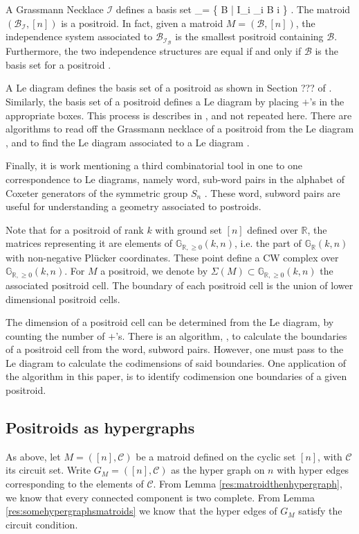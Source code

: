 \documentclass[11pt]{article}
\newcommand{\R}{\mathbb{R}}
\newcommand{\Gr}{\mathbb{G}_{\R, \geq 0}}
\newcommand{\Grall}{\mathbb{G}_{\R}}
\def\ba #1\ea{\begin{align} #1 \end{align}}
\newcommand{\cI}{\mathcal{I}}
\newcommand{\sC}{\mathscr{C}}
\newcommand{\cC}{\mathcal{C}}
\newcommand{\sB}{\mathscr{B}}
\theoremstyle{remark}
\theoremstyle{definition}
\begin{document}
A Grassmann Necklace $\cI$ defines a basis set \ba \sB_\cI = \{ B | I_i \preceq_i B \; \forall i \in [n]\} \;. \label{eq:I_B} \ea 
The matroid $(\sB_\cI, [n])$ is a positroid. In fact, given a matroid $M = (\sB, [n])$, the independence system associated to $\sB_{\cI_\sB}$ is the smallest positroid containing $\sB$. 
Furthermore, the two independence structures are equal if and only if $\sB$ is the basis set for a positroid \cite{Postnikov}.

A Le diagram defines the basis set of a positroid as shown in Section ??? of \cite{Postnikov}. Similarly, the basis set of a positroid defines a Le diagram by placing $+$'s in the appropriate boxes. This process is describes in \cite{Postnikov}, and not repeated here. There are algorithms to read off the Grassmann necklace of  a positroid from the Le diagram \cite{Oh}, and to find the Le diagram associated to a Le diagram \cite{GNtoLe}. 

Finally, it is work mentioning a third combinatorial tool in one to one correspondence to Le diagrams, namely word, sub-word pairs in the alphabet of Coxeter generators of the symmetric group $S_n$ \cite{Juggling}. These word, subword pairs are useful for understanding a geometry associated to postroids.

Note that for a positroid of rank $k$ with ground set $[n]$ defined over $\R$, the matrices representing it are elements of $\Gr(k,n)$, i.e. the part of $\Grall(k,n)$ with non-negative Pl\"{u}cker coordinates. These point define a CW complex over $\Gr(k,n)$. For $M$ a positroid, we denote by $\Sigma(M) \subset \Gr(k,n)$ the associated positroid cell\cite{GrBall, Postnikov}.  The boundary of each positroid cell is the union of lower dimensional positroid cells. 

The dimension of a positroid cell can be determined from the Le diagram, by counting the number of $+$'s. There is an algorithm, \cite{notes}, to calculate the boundaries of a positroid cell from the word, subword pairs. However, one must pass to the Le diagram to calculate the codimensions of said boundaries.  One application of the algorithm in this paper, is to identify codimension one boundaries of a given positroid.

\subsection{Positroids as hypergraphs \label{sec:positroidhypergraph}} 

As above, let $M = ([n], \sC)$ be a matroid defined on the cyclic set $[n]$, with $\sC$ its circuit set. Write $G_M = ([n], \sC)$ as the hyper graph on $n$ with hyper edges corresponding to the elements of $\cC$. From Lemma \ref{res:matroidthenhypergraph}, we know that every connected component is two complete. From Lemma \ref{res:somehypergraphsmatroids} we know that the hyper edges of $G_M$ satisfy the circuit condition. 
\end{document}

